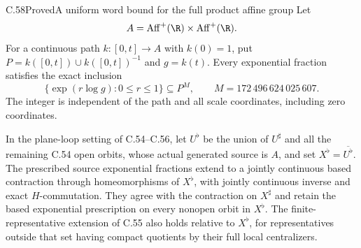 \begin{claim}{C.58}{Proved}{A uniform word bound for the full product affine group}
Let
\[
 A=\operatorname{Aff}^+(\R)\times\operatorname{Aff}^+(\R).
\]
For a continuous path $k:[0,t]\to A$ with $k(0)=1$, put
$P=k([0,t])\cup k([0,t])^{-1}$ and $g=k(t)$.
Every exponential fraction satisfies the exact inclusion
\[
 \{\exp(r\log g):0\leq r\leq1\}\subseteq P^M,
 \qquad M=172\,496\,624\,025\,607.                       \tag{C.58.1}
\]
The integer is independent of the path and all scale coordinates,
including zero coordinates.

In the plane-loop setting of C.54--C.56, let $U^\flat$
be the union of $U^\sharp$ and all the remaining C.54
open orbits, whose actual generated source is $A$, and set
$X^\flat=\overline{U^\flat}$.
The prescribed source exponential fractions extend to a
jointly continuous based contraction through homeomorphisms
of $X^\flat$, with jointly continuous inverse and exact
$H$-commutation. They agree with the contraction on
$X^\sharp$ and retain the based exponential prescription
on every nonopen orbit in $X^\flat$.
The finite-representative extension of C.55 also holds
relative to $X^\flat$, for representatives outside that
set having compact quotients by their full local centralizers.
\end{claim}

